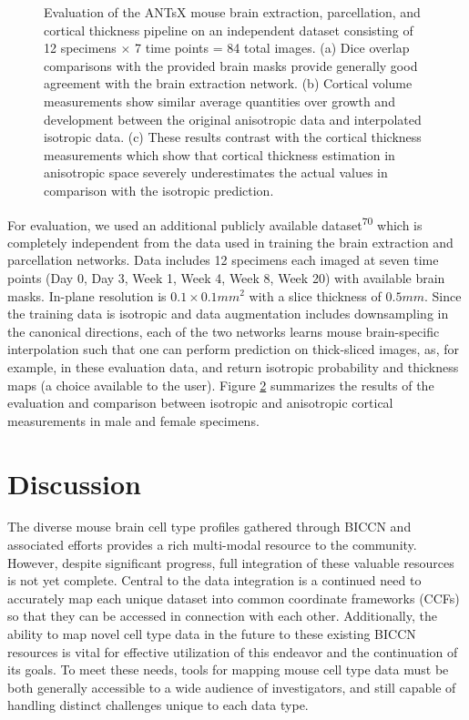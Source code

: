 \documentclass[
  12pt,
]{article}
\begin{document}
\begin{figure}
\begin{subfigure}{.5\textwidth}
  \caption{}
  \label{fig:subc}
\end{subfigure}
\caption{Evaluation of the ANTsX mouse brain extraction, parcellation, and
cortical thickness pipeline on an independent dataset consisting of 12 specimens
$\times$ 7 time points = 84 total images.  (a) Dice overlap comparisons with the
provided brain masks provide generally good agreement with the brain extraction
network. (b) Cortical volume measurements show similar average quantities over
growth and development between the original anisotropic data and interpolated
isotropic data.  (c) These results contrast with the cortical thickness
measurements which show that cortical thickness estimation in anisotropic space
severely underestimates the actual values in comparison with the isotropic
prediction.}
\label{fig:evaluation}
\end{figure}

For evaluation, we used an additional publicly available
dataset\textsuperscript{70} which is completely independent from the
data used in training the brain extraction and parcellation networks.
Data includes 12 specimens each imaged at seven time points (Day 0, Day
3, Week 1, Week 4, Week 8, Week 20) with available brain masks. In-plane
resolution is \(0.1 \times 0.1 mm^2\) with a slice thickness of
\(0.5 mm\). Since the training data is isotropic and data augmentation
includes downsampling in the canonical directions, each of the two
networks learns mouse brain-specific interpolation such that one can
perform prediction on thick-sliced images, as, for example, in these
evaluation data, and return isotropic probability and thickness maps (a
choice available to the user). Figure \ref{fig:evaluation} summarizes
the results of the evaluation and comparison between isotropic and
anisotropic cortical measurements in male and female specimens.

\clearpage
\newpage

\section{Discussion}\label{discussion}

The diverse mouse brain cell type profiles gathered through BICCN and
associated efforts provides a rich multi-modal resource to the
community. However, despite significant progress, full integration of
these valuable resources is not yet complete. Central to the data
integration is a continued need to accurately map each unique dataset
into common coordinate frameworks (CCFs) so that they can be accessed in
connection with each other. Additionally, the ability to map novel cell
type data in the future to these existing BICCN resources is vital for
effective utilization of this endeavor and the continuation of its
goals. To meet these needs, tools for mapping mouse cell type data must
be both generally accessible to a wide audience of investigators, and
still capable of handling distinct challenges unique to each data type.
\end{document}
